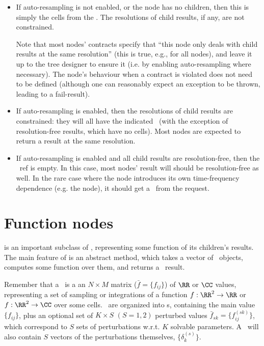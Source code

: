   \begin{itemize}
  
  \item If auto-resampling is not enabled, or the node has no children, then
  this is simply the cells from the \Request. The resolutions of child results,
  if any, are not constrained.
  
  Note that most nodes' contracts specify that ``this node only deals with
  child results at the same resolution'' (this is true, e.g., for all
   nodes), and leave it up to the tree designer to ensure it (i.e.
  by enabling auto-resampling where necessary). The node's behaviour when a
  contract is violated does not need to be defined (although one can reasonably
  expect an exception to be thrown, leading to a fail-result).

  \item If auto-resampling is enabled, then the resolutions of child results
  are constrained: they will all have the indicated \Cells\ (with the exception
  of resolution-free results, which have no cells). Most nodes are expected to
  return a result at the same resolution.

  \item If auto-resampling is enabled and all child results are
  resolution-free, then the \Cells\ ref is empty. In this case, most nodes'
  result will should be resolution-free as well. In the rare case where the
  node introduces its own time-frequency dependence (e.g. the  node),
  it should get a \Cells\ from the request.

  \end{itemize}

\section{Function nodes}
\label{sec:Function}

   is an important subclass of , representing some
  function of its children's results. The main feature of  is an
  abstract  method, which takes a vector of \Vells\ objects,
  computes some function over them, and returns a \Vells\ result.

  Remember that a \Vells\ is a an $N\times M$ matrix ($\bar{f}=\{f_{ij}\}$) of
  $\RR$ or $\CC$ values, representing a set of sampling or integrations of a
  function $f:\RR^2\rightarrow\RR$ or $f:\RR^2\rightarrow\CC$ over some cells.
  \Vells\ are organized into \VellSet{}s, containing the main value
  $\{f_{ij}\}$, plus an optional set of $K\times S$ $(S=1,2)$ perturbed values
  $\bar{f}_{sk} = \{f^{(sk)}_{ij}\}$, which correspond to $S$ sets of
  perturbations w.r.t. $K$ solvable parameters. A \VellSet\ will also contain
  $S$ vectors of the perturbations themselves, $\{\delta^{(s)}_k\}$.

